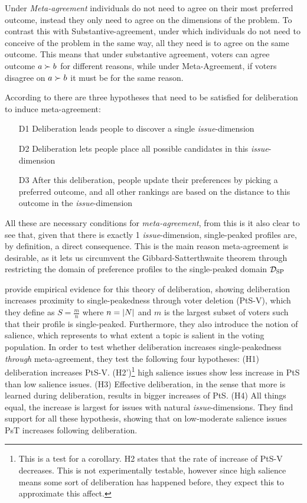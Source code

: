 Under \emph{Meta-agreement} individuals do not need to agree on their most
preferred outcome, instead they only need to agree on the dimensions of the
problem. To contrast this with Substantive-agreement, under which individuals
do not need to conceive of the problem in the same way, all they need is to
agree on the same outcome. This means that under substantive agreement, voters
can agree outcome $a \succ b$ for different reasons, while under
Meta-Agreement, if voters disagree on $a \succ b$ it must be for the same
reason.

According to \citet{listTwoConceptsAgreement2002} there are three hypotheses that need to be satisfied for deliberation to induce meta-agreement:
\begin{enumerate}
	\label{list:meta-agreement-checklist}
	\setlength\itemsep{1px}
	\item [D1] Deliberation leads people to discover a single \emph{issue}-dimension
	\item [D2] Deliberation lets people place all possible candidates in this \emph{issue}-dimension
	\item [D3] After this deliberation, people update their preferences by picking
	      a preferred outcome, and all other rankings are based on the distance to this outcome in the \emph{issue}-dimension
\end{enumerate}

All these are necessary conditions for \emph{meta-agreement}, from this is it
also clear to see that, given that there is exactly 1 \emph{issue}-dimension,
single-peaked profiles are, by definition, a direct consequence. This is the
main reason meta-agreement is desirable, as it lets us circumvent the
Gibbard-Satterthwaite theorem \citep{gibbardManipulationVotingSchemes1973,
	satterthwaiteStrategyproofnessArrowsConditions1975} through restricting the
domain of preference profiles to the single-peaked domain $\mathcal{D}_{\textnormal{SP}}$


\citet{listDeliberationSinglePeakednessPossibility2013} provide empirical
evidence for this theory of deliberation, showing deliberation increases
proximity to single-peakedness through voter deletion (PtS-V), which they define as $S= \frac{m}{n}$
where $n = |N|$ and $m$ is the largest subset of voters such that their
profile is single-peaked. Furthermore, they also introduce the notion of
salience, which represents to what extent a topic is salient in the voting
population. In order to test whether deliberation increases single-peakedness
\emph{through} meta-agreement, they test the following four hypotheses: (H1)
deliberation increases PtS-V. (H2')\footnote{This is a
	test for a corollary. H2 states that the rate of increase of PtS-V decreases. This is not experimentally testable, however since
	high salience means some sort of deliberation has happened before, they expect
	this to approximate this affect.} high salience issues show less increase in
PtS than low salience issues. (H3) Effective deliberation, in the sense that
more is learned during deliberation, results in bigger increases of PtS. (H4)
All things equal, the increase is largest for issues with natural
\emph{issue}-dimensions. They find support for all these hypothesis, showing
that on low-moderate salience issues PsT increases following deliberation.

